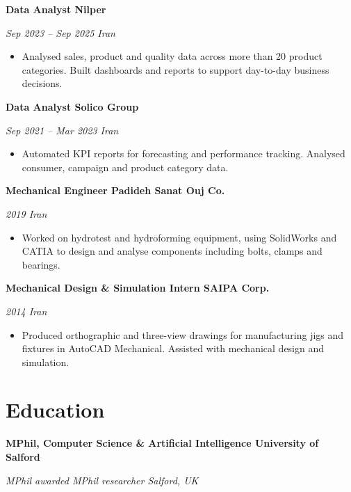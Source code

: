 \documentclass[10pt,a4paper]{article}
\let\cvOriginalTextbf\textbf
\renewcommand{\textbf}[1]{{\fontsize{10.5pt}{14pt}\selectfont\cvOriginalTextbf{#1}}}
\providecommand{\tightlist}{\setlength{\itemsep}{3pt}\setlength{\parskip}{0pt}}
\begin{document}
\textbf{Data Analyst \textbar{} Nilper}

\emph{Sep 2023 -- Sep 2025 \textbar{} Iran}

\begin{itemize}
\tightlist
\item
  Analysed sales, product and quality data across more than 20 product
  categories. Built dashboards and reports to support day-to-day
  business decisions.
\end{itemize}

\textbf{Data Analyst \textbar{} Solico Group}

\emph{Sep 2021 -- Mar 2023 \textbar{} Iran}

\begin{itemize}
\tightlist
\item
  Automated KPI reports for forecasting and performance tracking.
  Analysed consumer, campaign and product category data.
\end{itemize}

\textbf{Mechanical Engineer \textbar{} Padideh Sanat Ouj Co.}

\emph{2019 \textbar{} Iran}

\begin{itemize}
\tightlist
\item
  Worked on hydrotest and hydroforming equipment, using SolidWorks and
  CATIA to design and analyse components including bolts, clamps and
  bearings.
\end{itemize}

\textbf{Mechanical Design \& Simulation Intern \textbar{} SAIPA Corp.}

\emph{2014 \textbar{} Iran}

\begin{itemize}
\tightlist
\item
  Produced orthographic and three-view drawings for manufacturing jigs
  and fixtures in AutoCAD Mechanical. Assisted with mechanical design
  and simulation.
\end{itemize}


\section{Education}\label{education}

\textbf{MPhil, Computer Science \& Artificial Intelligence \textbar{}
University of Salford}

\emph{MPhil awarded \textbar{} MPhil researcher \textbar{} Salford, UK}
\end{document}
